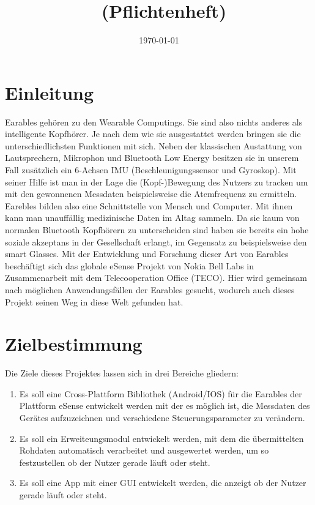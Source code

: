 \documentclass[a4paper,12pt]{article}
\title{\projektName~(Pflichtenheft)}
\author{\authorName}
\date{\today}
\begin{document}
 \setcounter{page}{2}
 \tableofcontents          %
 \clearpage

\section{Einleitung}
Earables gehören zu den Wearable Computings. Sie sind also nichts anderes als intelligente Kopfhörer. Je nach dem wie sie ausgestattet werden bringen sie die unterschiedlichsten Funktionen mit sich. Neben der klassischen Austattung von  Lautsprechern, Mikrophon und Bluetooth Low Energy besitzen sie in unserem Fall zusätzlich ein 6-Achsen IMU (Beschleunigungssensor und Gyroskop). Mit seiner Hilfe ist man in der Lage die (Kopf-)Bewegung des Nutzers zu tracken um mit den gewonnenen Messdaten  beispielsweise die Atemfrequenz zu ermitteln. Earebles bilden also eine Schnittstelle von Mensch und Computer. Mit ihnen kann man unauffällig medizinische Daten im Altag sammeln. Da sie kaum von normalen Bluetooth Kopfhörern zu unterscheiden sind haben sie bereits ein hohe soziale akzeptans in der Gesellschaft erlangt, im Gegensatz zu beispielsweise den smart Glasses. Mit der Entwicklung und Forschung dieser Art von Earables beschäftigt sich das globale eSense Projekt von Nokia Bell Labs in Zusammenarbeit mit dem Telecooperation Office (TECO). Hier wird gemeinsam nach möglichen Anwendungsfällen der Earables gesucht, wodurch auch dieses Projekt seinen Weg in diese Welt gefunden hat.
\section{Zielbestimmung}
Die Ziele dieses Projektes lassen sich in drei Bereiche gliedern:
\begin{enumerate}

  \item Es soll eine Cross-Plattform Bibliothek (Android/IOS) für die Earables der Plattform eSense entwickelt werden mit der es möglich ist, die Messdaten des Gerätes aufzuzeichnen und verschiedene Steuerungsparameter zu verändern.
  
  \item Es soll ein Erweiteungsmodul entwickelt werden, mit dem die übermittelten  Rohdaten automatisch verarbeitet und ausgewertet werden, um so festzustellen ob der Nutzer gerade läuft oder steht.
  
  \item Es soll eine App mit einer GUI entwickelt werden, die anzeigt ob der Nutzer gerade läuft oder steht.

\end{enumerate}
\end{document}
